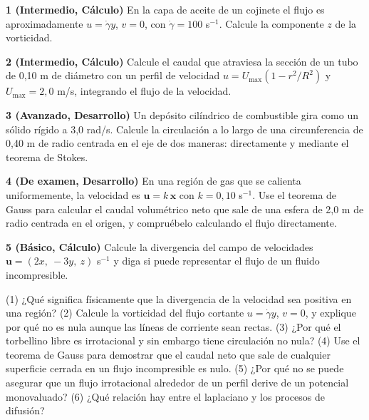 \documentclass[10pt,openany]{book}
\begin{document}
\begin{tcolorbox}[title={Ejercicios propuestos}, studiumworked, breakable]

\noindent\textbf{1 (Intermedio, Cálculo)}
En la capa de aceite de un cojinete el flujo es aproximadamente \(u = \dot\gamma y\), \(v = 0\), con \(\dot\gamma = 100\) s\(^{-1}\). Calcule la componente \(z\) de la vorticidad.

\noindent\textbf{2 (Intermedio, Cálculo)}
Calcule el caudal que atraviesa la sección de un tubo de 0,10 m de diámetro con un perfil de velocidad \(u = U_{\max}(1 - r^{2}/R^{2})\) y \(U_{\max} = 2{,}0\) m/s, integrando el flujo de la velocidad.

\noindent\textbf{3 (Avanzado, Desarrollo)}
Un depósito cilíndrico de combustible gira como un sólido rígido a 3,0 rad/s. Calcule la circulación a lo largo de una circunferencia de 0,40 m de radio centrada en el eje de dos maneras: directamente y mediante el teorema de Stokes.

\noindent\textbf{4 (De examen, Desarrollo)}
En una región de gas que se calienta uniformemente, la velocidad es \(\mathbf{u} = k\,\mathbf{x}\) con \(k = 0{,}10\) s\(^{-1}\). Use el teorema de Gauss para calcular el caudal volumétrico neto que sale de una esfera de 2,0 m de radio centrada en el origen, y compruébelo calculando el flujo directamente.

\noindent\textbf{5 (Básico, Cálculo)}
Calcule la divergencia del campo de velocidades \(\mathbf{u} = (2x,\ -3y,\ z)\) s\(^{-1}\) y diga si puede representar el flujo de un fluido incompresible.
\end{tcolorbox}

\begin{tcolorbox}[title={Autoevaluación}, studiumcheck, breakable]

(1) ¿Qué significa físicamente que la divergencia de la velocidad sea positiva en una región? (2) Calcule la vorticidad del flujo cortante \(u = \dot\gamma y\), \(v = 0\), y explique por qué no es nula aunque las líneas de corriente sean rectas. (3) ¿Por qué el torbellino libre es irrotacional y sin embargo tiene circulación no nula? (4) Use el teorema de Gauss para demostrar que el caudal neto que sale de cualquier superficie cerrada en un flujo incompresible es nulo. (5) ¿Por qué no se puede asegurar que un flujo irrotacional alrededor de un perfil derive de un potencial monovaluado? (6) ¿Qué relación hay entre el laplaciano y los procesos de difusión?
\end{tcolorbox}
\studiumchaptercheck
\end{document}
